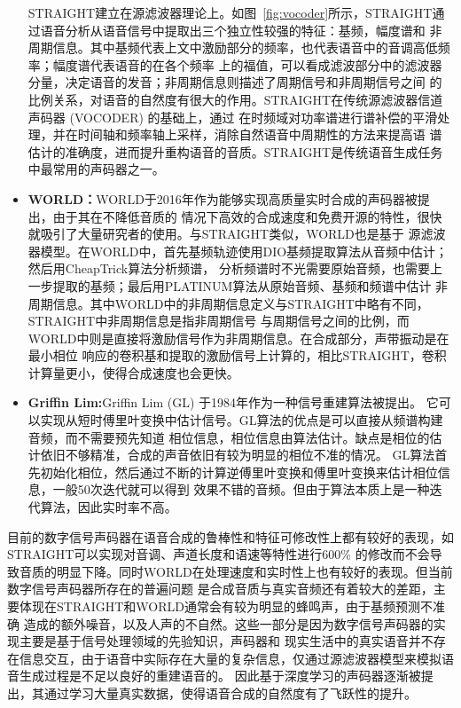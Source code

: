 \begin{itemize}
    STRAIGHT建立在源滤波器理论上。如图~\ref{fig:vocoder}所示，STRAIGHT通过语音分析从语音信号中提取出三个独立性较强的特征：基频，幅度谱和
    非周期信息。其中基频代表上文中激励部分的频率，也代表语音中的音调高低频率；幅度谱代表语音的在各个频率
    上的福值，可以看成滤波部分中的滤波器分量，决定语音的发音；非周期信息则描述了周期信号和非周期信号之间
    的比例关系，对语音的自然度有很大的作用。STRAIGHT在传统源滤波器信道声码器 (VOCODER) 的基础上，通过
    在时频域对功率谱进行谱补偿的平滑处理，并在时间轴和频率轴上采样，消除自然语音中周期性的方法来提高语
    谱估计的准确度，进而提升重构语音的音质\cite{杨骋基于简化}。STRAIGHT是传统语音生成任务中最常用的声码器之一。
    \item \textbf{WORLD：}WORLD于2016年作为能够实现高质量实时合成的声码器被提出，由于其在不降低音质的
    情况下高效的合成速度和免费开源的特性，很快就吸引了大量研究者的使用\cite{morise2016world}。与STRAIGHT类似，WORLD也是基于
    源滤波器模型。在WORLD中，首先基频轨迹使用DIO基频提取算法从音频中估计；然后用CheapTrick算法分析频谱，
    分析频谱时不光需要原始音频，也需要上一步提取的基频；最后用PLATINUM算法从原始音频、基频和频谱中估计
    非周期信息。其中WORLD中的非周期信息定义与STRAIGHT中略有不同，STRAIGHT中非周期信息是指非周期信号
    与周期信号之间的比例，而WORLD中则是直接将激励信号作为非周期信息。在合成部分，声带振动是在最小相位
    响应的卷积基和提取的激励信号上计算的，相比STRAIGHT，卷积计算量更小，使得合成速度也会更快。
    \item \textbf{Griffin Lim:}Griffin Lim (GL) 于1984年作为一种信号重建算法被提出\cite{griffin1984signal}。
    它可以实现从短时傅里叶变换中估计信号。GL算法的优点是可以直接从频谱构建音频，而不需要预先知道
    相位信息，相位信息由算法估计。缺点是相位的估计依旧不够精准，合成的声音依旧有较为明显的相位不准的情况。
    GL算法首先初始化相位，然后通过不断的计算逆傅里叶变换和傅里叶变换来估计相位信息，一般50次迭代就可以得到
    效果不错的音频。但由于算法本质上是一种迭代算法，因此实时率不高。
\end{itemize}

目前的数字信号声码器在语音合成的鲁棒性和特征可修改性上都有较好的表现，如STRAIGHT可以实现对音调、声道长度和语速等特性进行600\%
的修改而不会导致音质的明显下降。同时WORLD在处理速度和实时性上也有较好的表现。但当前数字信号声码器所存在的普遍问题
是合成音质与真实音频还有着较大的差距，主要体现在STRAIGHT和WORLD通常会有较为明显的蜂鸣声，由于基频预测不准确
造成的额外噪音，以及人声的不自然。这些一部分是因为数字信号声码器的实现主要是基于信号处理领域的先验知识，声码器和
现实生活中的真实语音并不存在信息交互，由于语音中实际存在大量的复杂信息，仅通过源滤波器模型来模拟语音生成过程是不足以良好的重建语音的。
因此基于深度学习的声码器逐渐被提出，其通过学习大量真实数据，使得语音合成的自然度有了飞跃性的提升。

